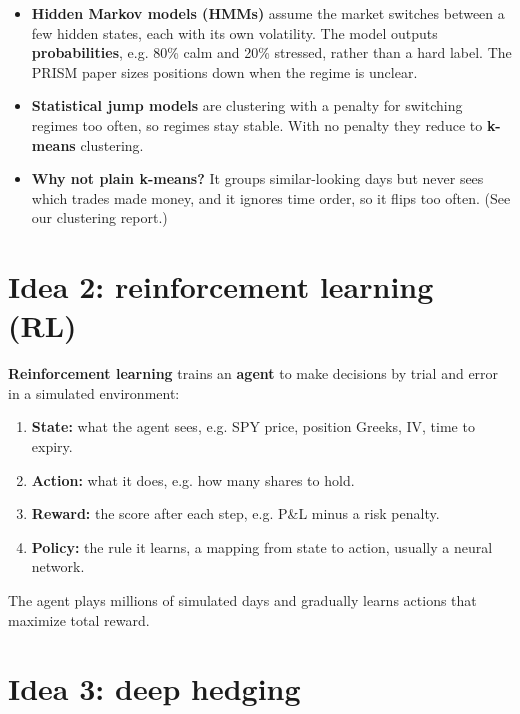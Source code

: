 \documentclass{article}
\begin{document}
\begin{itemize}

\item \textbf{Hidden Markov models (HMMs)} assume the market switches between a few hidden states, each with its own volatility. The model outputs \textbf{probabilities}, e.g. 80\% calm and 20\% stressed, rather than a hard label. The PRISM paper sizes positions down when the regime is unclear.

\item \textbf{Statistical jump models} are clustering with a penalty for switching regimes too often, so regimes stay stable. With no penalty they reduce to \textbf{k-means} clustering.

\item \textbf{Why not plain k-means?} It groups similar-looking days but never sees which trades made money, and it ignores time order, so it flips too often. (See our clustering report.)

\end{itemize}

\section{Idea 2: reinforcement learning (RL)}

\textbf{Reinforcement learning} trains an \textbf{agent} to make decisions by trial and error in a simulated environment:

\begin{enumerate}

\item \textbf{State:} what the agent sees, e.g. SPY price, position Greeks, IV, time to expiry.

\item \textbf{Action:} what it does, e.g. how many shares to hold.

\item \textbf{Reward:} the score after each step, e.g. P\&L minus a risk penalty.

\item \textbf{Policy:} the rule it learns, a mapping from state to action, usually a neural network.

\end{enumerate}

The agent plays millions of simulated days and gradually learns actions that maximize total reward.

\section{Idea 3: deep hedging}
\end{document}
